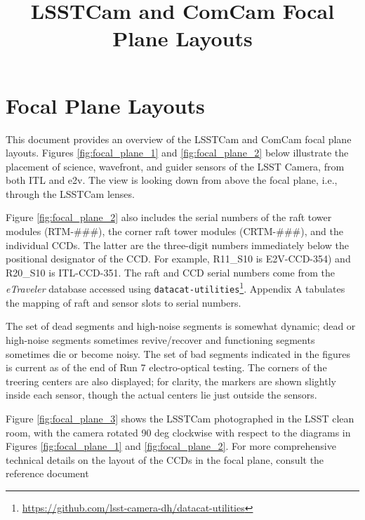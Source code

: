 \documentclass[CTN,authoryear,toc]{lsstdoc}
\title{LSSTCam and ComCam Focal Plane Layouts}
\date{\vcsDate}
\begin{document}
\maketitle


\section{Focal Plane Layouts}
This document provides an overview of the LSSTCam and ComCam focal plane layouts.
Figures \ref{fig:focal_plane_1} and \ref{fig:focal_plane_2} below illustrate the placement of science, wavefront, and guider sensors of the LSST Camera, from both ITL and e2v.
The view is looking down from above the focal plane, i.e., through the LSSTCam lenses.

Figure \ref{fig:focal_plane_2} also includes the serial numbers of the raft tower modules (RTM-\#\#\#), the corner raft tower modules (CRTM-\#\#\#), and the individual CCDs.
The latter are the three-digit numbers immediately below the positional designator of the CCD.
For example, R11\_S10 is E2V-CCD-354) and R20\_S10 is ITL-CCD-351.
The raft and CCD serial numbers come from the \emph{eTraveler} database accessed using {\tt{datacat-utilities}}\footnote{\url{https://github.com/lsst-camera-dh/datacat-utilities}}.
Appendix A tabulates the mapping of raft and sensor slots to serial numbers.

The set of dead segments and high-noise segments is somewhat dynamic; dead or high-noise segments sometimes revive/recover and functioning segments sometimes die or become noisy.
The set of bad segments indicated in the figures is current as of the end of Run 7 electro-optical testing.
The corners of the treering centers are also displayed; for clarity, the markers are shown slightly inside each sensor, though the actual centers lie just outside the sensors.

Figure \ref{fig:focal_plane_3} shows the LSSTCam photographed in the LSST clean room, with the camera rotated 90 deg clockwise with respect to the diagrams in Figures \ref{fig:focal_plane_1} and \ref{fig:focal_plane_2}.
For more comprehensive technical details on the layout of the CCDs in the focal plane, consult the reference document 
\end{document}
